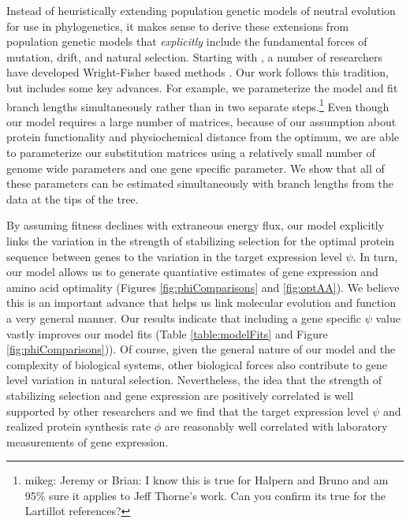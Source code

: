 \documentclass{article}
\begin{document}
Instead of heuristically extending population genetic models of neutral evolution for use in phylogenetics, it makes sense to derive these extensions from population genetic models that \emph{explicitly} include the fundamental forces of mutation, drift, and natural selection. %
Starting with \citet{HalpernAndBruno1998}, a number of researchers have developed Wright-Fisher based methods \citep[e.g.~][]{KoshiEtAl1999,DimmicEtAl2000,KoshiAndGoldstein2001,RobinsonEtAl2003,LartillotAndPhilippe2004,ThorneEtAl2012,RodrigueAndLartillot2014}.%
Our work follows this tradition, but includes some key advances.
For example, we parameterize the model and fit branch lengths simultaneously rather than in two separate steps.\footnote{mikeg: Jeremy or Brian: I know this is true for Halpern and Bruno and am 95\% sure it applies to Jeff Thorne's work.
        Can you confirm its true for the Lartillot references?}
 Even though our model requires a large number of matrices, because of our assumption about protein functionality and physiochemical distance from the optimum, we are able to parameterize our substitution matrices using a relatively small number of genome wide parameters and one gene specific parameter.
      We show that all of these parameters can be estimated simultaneously with branch lengths from the data at the tips of the tree.

      By assuming fitness declines with extraneous energy flux, our model explicitly links the variation in the strength of stabilizing selection for the optimal protein sequence between genes to the variation in the target expression level $\psi$.
      In turn, our model allows us to generate quantiative estimates of gene expression and amino acid optimality (Figures \ref{fig:phiComparisons} and \ref{fig:optAA}).
      We believe this is an important advance that helps us link molecular evolution and function a very general manner.
      Our results indicate that including a gene specific $\psi$ value vastly improves our model fits (Table \ref{table:modelFits} and Figure \ref{fig:phiComparisons})).
      Of course, given the general nature of our model and the complexity of biological systems, other biological forces also contribute to gene level variation in natural selection.
      Nevertheless, the idea that the strength of stabilizing selection and gene expression are positively correlated is well supported by other researchers \citep[e.g.][]{DrummondEtAl2005} and we find that the target expression level $\psi$ and realized protein synthesis rate $\phi$ are reasonably well correlated with laboratory measurements of gene expression.
\end{document}
